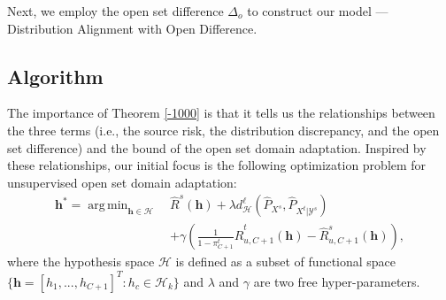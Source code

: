 \documentclass[journal]{IEEEtran}
\DeclareMathOperator*{\argmin}{arg\,min}
\begin{document}
Next, we employ the open set difference $\Delta_o$ to construct our model --- Distribution Alignment with Open Difference.

  \subsection{{Algorithm}}
The importance of {Theorem \ref{-1000}} is that it tells us the relationships between the three terms (i.e., the source risk, the distribution discrepancy, and the open set difference) and the bound of the open set domain adaptation. Inspired by these relationships, our initial focus is  the following optimization problem for unsupervised open set domain adaptation:
\begin{equation}
  \begin{split}
    {\bm h}^*=\argmin_{{\bm h}\in \mathcal{H}} ~ &\widehat{R}^s({\bm h})+\lambda d^{\ell}_{\mathcal{H}}(\widehat{P}_{X^s},\widehat{P}_{X^t|\mathcal{Y}^s})
    \\
    &+\gamma \left(\frac{1}{1-\pi_{C+1}^t}\widehat{R}^t_{u,C+1}({\bm h})
 -\widehat{R}^s_{u,C+1}({\bm h})\right),
    \end{split}\label{allobje}
\end{equation}
where the hypothesis space $\mathcal{H}$ is defined as a subset of functional space $\{{\bm h}=[h_1,...,h_{C+1}]^T: h_c \in \mathcal{H}_k\}$ and $\lambda$ and $\gamma$ are two free hyper-parameters.
\end{document}

